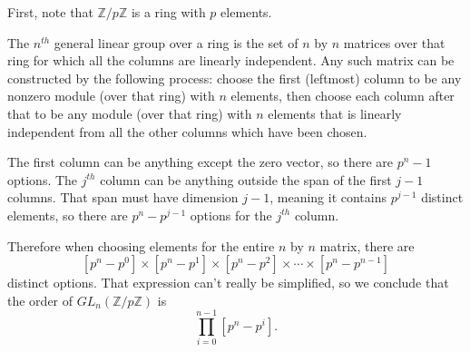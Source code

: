 \documentclass[12pt]{article}
\begin{document}
\bigskip
\noindent{}\bigskip

First, note that $\mathbb{Z}/p\mathbb{Z}$ is a ring with $p$ elements.

The $n^{th}$ general linear group over a ring is the set of $n$ by $n$ matrices over that ring for which all the columns are linearly independent. Any such matrix can be constructed by the following process: choose the first (leftmost) column to be any nonzero module (over that ring) with $n$ elements, then choose each column after that to be any module (over that ring) with $n$ elements that is linearly independent from all the other columns which have been chosen.
\par
The first column can be anything except the zero vector, so there are $p^n - 1$ options. The $j^{th}$ column can be anything outside the span of the first $j-1$ columns. That span must have dimension $j-1$, meaning it contains $p^{j-1}$ distinct elements, so there are $p^n - p^{j-1}$ options for the $j^{th}$ column.
\par
Therefore when choosing elements for the entire $n$ by $n$ matrix, there are
\[ \left[ p^n - p^0 \right] \times \left[ p^n - p^1 \right] \times \left[ p^n - p^2 \right] \times \cdots \times \left[ p^n - p^{n-1} \right] \]
distinct options. That expression can't really be simplified, so we conclude that the order of $GL_n(\mathbb{Z}/p\mathbb{Z})$ is
\[ \prod_{i=0}^{n-1} [ p^n - p^i ]. \]
\end{document}
